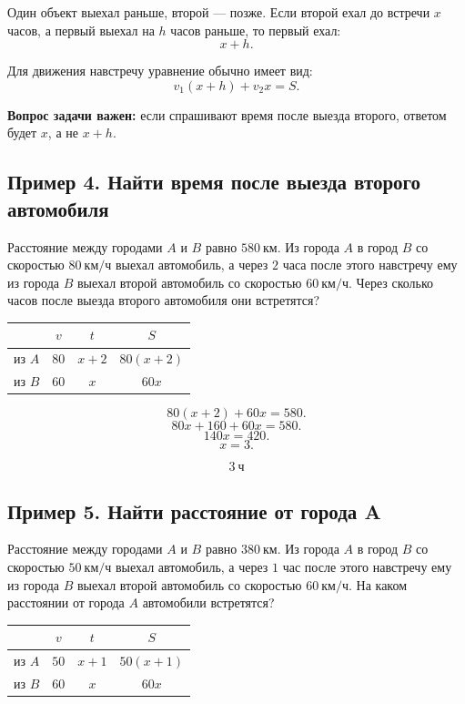 \documentclass[a4paper,12pt]{article}
\newcommand{\important}[1]{\textcolor{darkaccent}{\textbf{#1}}}
\newcommand{\kmh}{\text{км/ч}}
\newcommand{\km}{\text{км}}
\newcommand{\ch}{\text{ч}}
\begin{document}
Один объект выехал раньше, второй --- позже. Если второй ехал до встречи $x$ часов, а первый выехал на $h$ часов раньше, то первый ехал:
\[
x+h.
\]

Для движения навстречу уравнение обычно имеет вид:
\[
v_1(x+h)+v_2x=S.
\]

\important{Вопрос задачи важен:} если спрашивают время после выезда второго, ответом будет $x$, а не $x+h$.

\subsection{Пример 4. Найти время после выезда второго автомобиля}

Расстояние между городами $A$ и $B$ равно $580\ \km$. Из города $A$ в город $B$ со скоростью $80\ \kmh$ выехал автомобиль, а через $2$ часа после этого навстречу ему из города $B$ выехал второй автомобиль со скоростью $60\ \kmh$. Через сколько часов после выезда второго автомобиля они встретятся?

\begin{center}
\renewcommand{\arraystretch}{1.35}
\begin{tabularx}{0.75\linewidth}{X c c c}
\toprule
 & $v$ & $t$ & $S$ \\
\midrule
из $A$ & $80$ & $x+2$ & $80(x+2)$ \\
из $B$ & $60$ & $x$ & $60x$ \\
\bottomrule
\end{tabularx}
\end{center}

\[
80(x+2)+60x=580.
\]
\[
80x+160+60x=580.
\]
\[
140x=420.
\]
\[
x=3.
\]

\[
\boxed{3\ \ch}
\]

\subsection{Пример 5. Найти расстояние от города A}

Расстояние между городами $A$ и $B$ равно $380\ \km$. Из города $A$ в город $B$ со скоростью $50\ \kmh$ выехал автомобиль, а через $1$ час после этого навстречу ему из города $B$ выехал второй автомобиль со скоростью $60\ \kmh$. На каком расстоянии от города $A$ автомобили встретятся?

\begin{center}
\renewcommand{\arraystretch}{1.35}
\begin{tabularx}{0.75\linewidth}{X c c c}
\toprule
 & $v$ & $t$ & $S$ \\
\midrule
из $A$ & $50$ & $x+1$ & $50(x+1)$ \\
из $B$ & $60$ & $x$ & $60x$ \\
\bottomrule
\end{tabularx}
\end{center}
\end{document}

